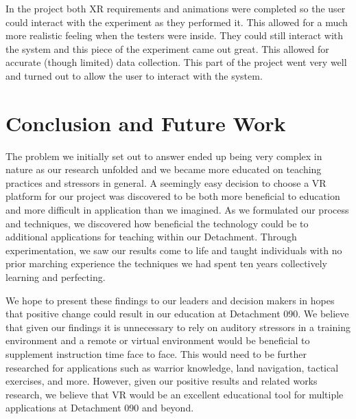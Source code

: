 \documentclass[manuscript,screen,review]{acmart}
\begin{document}
In the project both XR requirements and animations were completed so the user could interact with the 
experiment as they performed it. This allowed for a much more realistic feeling when the testers were 
inside. They could still interact with the system and this piece of the experiment came out great. This 
allowed for accurate (though limited) data collection. This part of the project went very well and turned 
out to allow the user to interact with the system. 

\section{Conclusion and Future Work}
The problem we initially set out to answer ended up being very complex in nature as our research unfolded 
and we became more educated on teaching practices and stressors in general. A seemingly easy decision to 
choose a VR platform for our project was discovered to be both more beneficial to education and more 
difficult in application than we imagined. As we formulated our process and techniques, we discovered 
how beneficial the technology could be to additional applications for teaching within our Detachment. 
Through experimentation, we saw our results come to life and taught individuals with no prior marching 
experience the techniques we had spent ten years collectively learning and perfecting.  

We hope to present these findings to our leaders and decision makers in hopes that positive change 
could result in our education at Detachment 090. We believe that given our findings it is unnecessary 
to rely on auditory stressors in a training environment and a remote or virtual environment would be 
beneficial to supplement instruction time face to face. This would need to be further researched for 
applications such as warrior knowledge, land navigation, tactical exercises, and more. However, given 
our positive results and related works research, we believe that VR would be an excellent educational 
tool for multiple applications at Detachment 090 and beyond.\\ \\ \\ \\ \\ \\ \\
\end{document}
